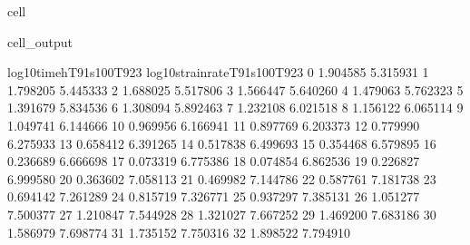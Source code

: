 \documentclass[letterpaper,10pt,english]{jupyterBook}
\begin{document}
\begin{sphinxuseclass}{cell}
\begin{sphinxVerbatimOutput}
\begin{sphinxuseclass}{cell_output}
\begin{sphinxVerbatim}[commandchars=\\\{\}]
					log10timeh\PYGZus{}T91s100T923  log10strainrate\PYGZus{}T91s100T923  \PYGZbs{}
					0                \PYGZhy{}1.904585                    \PYGZhy{}5.315931   
					1                \PYGZhy{}1.798205                    \PYGZhy{}5.445333   
					2                \PYGZhy{}1.688025                    \PYGZhy{}5.517806   
					3                \PYGZhy{}1.566447                    \PYGZhy{}5.640260   
					4                \PYGZhy{}1.479063                    \PYGZhy{}5.762323   
					5                \PYGZhy{}1.391679                    \PYGZhy{}5.834536   
					6                \PYGZhy{}1.308094                    \PYGZhy{}5.892463   
					7                \PYGZhy{}1.232108                    \PYGZhy{}6.021518   
					8                \PYGZhy{}1.156122                    \PYGZhy{}6.065114   
					9                \PYGZhy{}1.049741                    \PYGZhy{}6.144666   
					10               \PYGZhy{}0.969956                    \PYGZhy{}6.166941   
					11               \PYGZhy{}0.897769                    \PYGZhy{}6.203373   
					12               \PYGZhy{}0.779990                    \PYGZhy{}6.275933   
					13               \PYGZhy{}0.658412                    \PYGZhy{}6.391265   
					14               \PYGZhy{}0.517838                    \PYGZhy{}6.499693   
					15               \PYGZhy{}0.354468                    \PYGZhy{}6.579895   
					16               \PYGZhy{}0.236689                    \PYGZhy{}6.666698   
					17               \PYGZhy{}0.073319                    \PYGZhy{}6.775386   
					18                0.074854                    \PYGZhy{}6.862536   
					19                0.226827                    \PYGZhy{}6.999580   
					20                0.363602                    \PYGZhy{}7.058113   
					21                0.469982                    \PYGZhy{}7.144786   
					22                0.587761                    \PYGZhy{}7.181738   
					23                0.694142                    \PYGZhy{}7.261289   
					24                0.815719                    \PYGZhy{}7.326771   
					25                0.937297                    \PYGZhy{}7.385131   
					26                1.051277                    \PYGZhy{}7.500377   
					27                1.210847                    \PYGZhy{}7.544928   
					28                1.321027                    \PYGZhy{}7.667252   
					29                1.469200                    \PYGZhy{}7.683186   
					30                1.586979                    \PYGZhy{}7.698774   
					31                1.735152                    \PYGZhy{}7.750316   
					32                1.898522                    \PYGZhy{}7.794910   

\end{sphinxVerbatim}
\end{sphinxuseclass}
\end{sphinxVerbatimOutput}
\end{sphinxuseclass}
\end{document}
